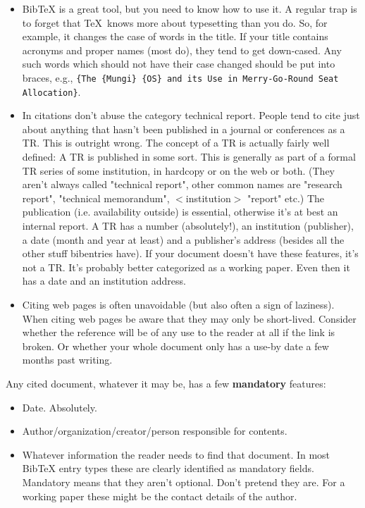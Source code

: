 \begin{itemize}
\item BibTeX is a great tool, but you need to know how to use it. A regular trap is to forget that \TeX~knows more about typesetting than you do. So, for example, it changes the case of words in the title. If your title contains acronyms and proper names (most do), they tend to get down-cased. Any such words which should not have their case changed should be put into braces, e.g., \verb|{The {Mungi} {OS} and its Use in Merry-Go-Round Seat Allocation}|.


\item In citations don't abuse the category technical report. People tend to cite just about anything that hasn't been published in a journal or conferences as a TR. This is outright wrong. The concept of a TR is actually fairly well defined: A TR is published in some sort. This is generally as part of a formal TR series of some institution, in hardcopy or on the web or both. (They aren't always called "technical report", other common names are "research report", "technical memorandum", $<$institution$>$ "report" etc.) The publication (i.e. availability outside) is essential, otherwise it's at best an internal report.
A TR has a number (absolutely!), an institution (publisher), a date (month and year at least) and a publisher's address (besides all the other stuff bibentries have).
If your document doesn't have these features, it's not a TR. It's probably better categorized as a working paper. Even then it has a date and an institution address.

\item Citing web pages is often unavoidable (but also often a sign of laziness). When citing web pages be aware that they may only be short-lived. Consider whether the reference will be of any use to the reader at all if the link is broken. Or whether your whole document only has a use-by date a few months past writing.

\end{itemize}

Any cited document, whatever it may be, has a few \textbf{mandatory} features:
\begin{itemize}
	\item Date. Absolutely. 
	\item Author/organization/creator/person responsible for contents.
	\item Whatever information the reader needs to find that document. In most BibTeX entry types these are clearly identified as mandatory fields. Mandatory means that they aren't optional. Don't pretend they are. For a working paper these might be the contact details of the author.
\end{itemize}


